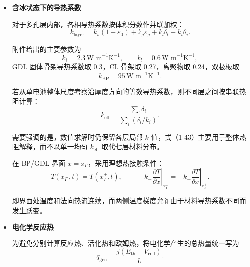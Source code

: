 \documentclass[bwprint]{gmcmthesis}
\numberwithin{figure}{section}
\begin{document}
\begin{itemize}
于是两侧双极板合计单位面积热容以及单电池完整热域单位面积热容分别为
\[
C_{A,\text{BP}} = 2 L_{\text{BP}} (\rho c_p)_{\text{BP}} = 6066.72 \, \text{J m}^{-2}\text{K}^{-1},
\]
\begin{equation}
C_{A,\text{cell}}(t) = C_{A,\text{BP}} + \int_{\Omega_{\text{MEA}}} (\rho c_p)_{\text{eff}}(x,t) \, \mathrm{d}x. \tag{4-60}
\end{equation}

其中 MEA 部分热容随局部水、冰状态变化，而双极板热容由固定材料参数决定。


\item \textbf {含冰状态下的导热系数}

对于多孔层内部，各相导热系数按体积分数作并联加权：
\begin{equation}
k_{\text{layer}} = k_s(1 - \varepsilon_0) + k_g \varepsilon_g + k_l \theta_l + k_i \theta_i. \tag{4-61}
\end{equation}

附件给出的主要参数为
\[
k_i = 2.3 \, \text{W m}^{-1}\text{K}^{-1}, \qquad k_l = 0.6 \, \text{W m}^{-1}\text{K}^{-1},
\]
GDL 固体骨架导热系数取 0.3，CL 骨架取 0.27，离聚物取 0.24，双极板取
\[
k_{\text{BP}} = 95 \, \text{W m}^{-1}\text{K}^{-1}.
\]

若从单电池整体尺度考察沿厚度方向的等效导热系数，则不同层之间按串联热阻计算：
\begin{equation}
k_{\text{eff}} = \frac{\sum\limits_i \delta_i}{\sum\limits_i (\delta_i / k_i)}. \tag{4-62}
\end{equation}

需要强调的是，数值求解时仍保留各层局部 \(k\) 值，式（1-43）主要用于整体热阻解释，而不以单一均匀 \(k_{\text{eff}}\) 取代七层材料分布。

在 BP/GDL 界面 \(x = x_\Gamma\)，采用理想热接触条件：
\begin{equation}
T(x_\Gamma^-, t) = T(x_\Gamma^+, t), \qquad -k_- \left.\frac{\partial T}{\partial x}\right|_{x_\Gamma^-} = -k_+ \left.\frac{\partial T}{\partial x}\right|_{x_\Gamma^+}. \tag{4-63}
\end{equation}

即界面处温度和法向热流连续，而两侧温度梯度允许由于材料导热系数不同而发生跃变。

\item \textbf {电化学反应热}

为避免分别计算反应热、活化热和欧姆热，将电化学产生的总热量统一写为
\begin{equation}
\dot{q}_{\text{gen}} = \frac{j(E_{\text{th}} - V_{\text{cell}})}{L}. \tag{4-64}
\end{equation}


\end{itemize}
\end{document}
